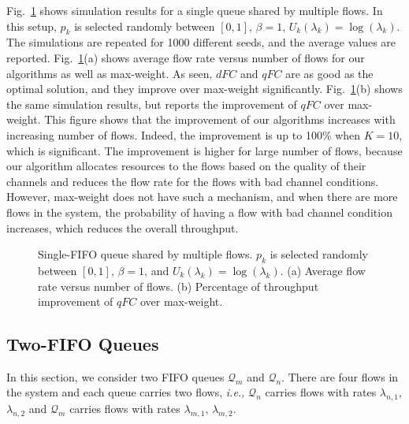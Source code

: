 \documentclass[conference]{IEEEtran}
\newcommand{\ie}{{\em i.e., }}
\newcommand{\Qset}{\mathcal{Q}}
\begin{document}
Fig.~\ref{fig:sim_2} shows simulation results for a single queue shared by multiple flows. In this setup, $p_k$ is selected randomly between $[0,1]$, $\beta = 1$, $U_k(\lambda_k) = \log(\lambda_k)$. The simulations are repeated for 1000 different seeds, and the average values are reported.  Fig.~\ref{fig:sim_2}(a) shows average flow rate versus number of flows for our algorithms as well as max-weight. As seen, $dFC$ and $qFC$ are as good as the optimal solution, and they improve over max-weight significantly. Fig.~\ref{fig:sim_2}(b) shows the same simulation results, but reports the improvement of $qFC$ over max-weight. This figure shows that the improvement of our algorithms increases with increasing number of flows. Indeed, the improvement is up to 100\% when $K=10$, which is significant. The improvement is higher for large number of flows, because our algorithm allocates resources to the flows based on the quality of their channels and reduces the flow rate for the flows with bad channel conditions. However, max-weight does not have such a mechanism, and when there are more flows in the system, the probability of having a flow with bad channel condition increases, which reduces the overall throughput.

\begin{figure}
\centering
{} \hspace{-20pt}
\vspace{-10pt}
\caption{Single-FIFO queue shared by multiple flows. $p_k$ is selected randomly between $[0,1]$, $\beta = 1$, and $U_k(\lambda_k) = \log(\lambda_k)$. (a) Average flow rate versus number of flows. (b) Percentage of throughput improvement of $qFC$ over max-weight. }
\label{fig:sim_2}
\vspace{-5pt}
\end{figure}

\subsection{Two-FIFO Queues}
In this section, we consider two FIFO queues $\Qset_{m}$ and $\Qset_{n}$. There are four flows in the system and each queue carries two flows, \ie $\Qset_{n}$ carries flows with rates $\lambda_{n,1}$, $\lambda_{n,2}$ and $\Qset_{m}$ carries flows with rates $\lambda_{m,1}$, $\lambda_{m,2}$. 
\end{document}
